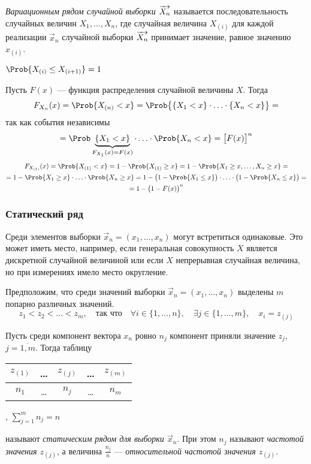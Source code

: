 \begin{defn}
	\emph{Вариационным рядом случайной выборки $\overrightarrow{X_n}$} называется последовательность случайных величин $X_{1}, \dots, X_{n}$, где случайная величина $X_{(i)}$ для каждой реализации $\vec{x}_n$ случайной выборки $\overrightarrow{X_n}$ принимает значение, равное значению $x_{(i)}$.
\end{defn}
\begin{rem}
	$\Prob \{ X_{(i)} \leq X_{(i+1)} \} = 1$
\end{rem}
\begin{rem}
	Пусть $F(x)$ --- функция распределения случайной величины $X$. Тогда
	\[
		F_{X_n}(x) = \Prob \{ X_{(n)} < x \} = \Prob \bigl\{ \{ X_1 < x \} \cdot \ldots \cdot \{ X_n < x \} \bigr\} =
	\]
	так как события независимы
	\[
		= \Prob \underbrace{\{ X_1 < x \}}_{F_{X_1}(x) = F(x)} \cdot \ldots \cdot \Prob \{ X_n < x \} = \bigl[ F(x) \bigr]^n
	\]
	\begin{multline*}
		F_{X_{(1)}}(x) = \Prob \{ X_{(1)} < x \} = 1 - \Prob \{ X_{(1)} \geq x \} = 1 - \Prob \{ X_1 \geq x, \ldots, X_n \geq x \} = \\
		= 1 - \Prob \{ X_1 \geq x \} \cdot \ldots \cdot \Prob \{ X_n \geq x \} = 1 - \bigl(1 - \Prob \{ X_1 \leq x \}\bigr) \cdot \ldots \cdot \bigl(1 - \Prob \{ X_n \leq x \}\bigr) = \\
		= 1 - \bigl(1 - F(x)\bigr)^n
	\end{multline*}
\end{rem}


\subsubsection{Статический ряд}

Среди элементов выборки $\vec{x}_n = (x_1, \ldots, x_n)$ могут встретиться одинаковые. Это может иметь место, например, если генеральная совокупность $X$ является дискретной случайной величиной или если $X$ непрерывная случайная величина, но при измерениях имело место округление.

Предположим, что среди значений выборки $\vec{x}_n = (x_1, \ldots, x_n)$ выделены $m$ попарно различных значений. 
\[
	z_{1} < z_{2} < \ldots < z_{m}, \quad \text{так что} \quad \forall i \in \{ 1, \ldots, n \}, \quad \exists j \in \{ 1, \ldots, m \}, \quad x_i = z_{(j)}
\]

Пусть среди компонент вектора $x_n$ ровно $n_j$ компонент приняли значение $z_j$, $j = \overline{1, m}$. Тогда таблицу
\begin{center} \begin{tabular}{| c | c | c | c | c |}
		\hline
		$z_{(1)}$ & \ldots & $z_{(j)}$ & \ldots & $z_{(m)}$ \\
		\hline
		$n_1$ & \ldots & $n_j$ & \ldots & $n_m$ \\
		\hline
\end{tabular} ,
\qquad $\sum_{j = 1}^{m} n_j = n$ \end{center}
называют \emph{статическим рядом для выборки $\vec{x}_n$}. При этом $n_j$ называют \emph{частотой значения $z_{(j)}$}, а величина $\frac{n_j}{n}$ --- \emph{относительной частотой значения $z_{(j)}$}.


